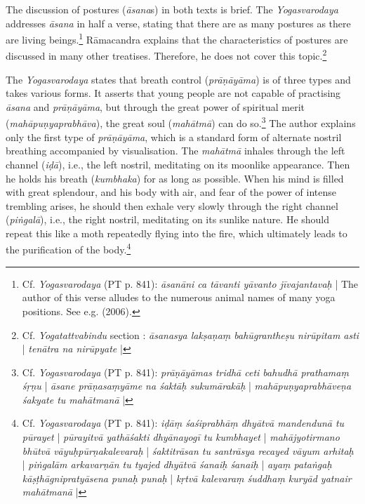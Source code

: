 The discussion of postures (\textit{āsana}s) in both texts is brief. The \emph{Yogasvarodaya} addresses \textit{āsana} in half a verse, stating that there are as many postures as there are living beings.\footnote{Cf. \textit{Yogasvarodaya} (PT p. 841): \textit{āsanāni ca tāvanti yāvanto jīvajantavaḥ} | The author of this verse alludes to the numerous animal names of many yoga positions. See e.g. \citeauthor{encyclopediaasana} (2006).} Rāmacandra explains that the characteristics of postures are discussed in many other treatises. Therefore, he does not cover this topic.\footnote{Cf. \textit{Yogatattvabindu} section : \textit{āsanasya lakṣaṇaṃ bahūgrantheṣu nirūpitam asti} | \textit{tenātra na nirūpyate} |}

The \textit{Yogasvarodaya} states that breath control (\textit{prāṇāyāma}) is of three types and takes various forms. It asserts that young people are not capable of practising \textit{āsana} and \textit{prāṇāyāma}, but through the great power of spiritual merit (\textit{mahāpuṇyaprabhāva}), the great soul (\textit{mahātmā}) can do so.\footnote{Cf. \textit{Yogasvarodaya} (PT p. 841): \textit{prāṇāyāmas tridhā ceti bahudhā prathamaṃ śṛṇu} | \textit{āsane prāṇasaṃyāme na śaktāḥ sukumārakāḥ} | \textit{mahāpuṇyaprabhāveṇa śakyate tu mahātmanā} |} The author explains only the first type of \textit{prāṇāyāma}, which is a standard form of alternate nostril breathing accompanied by visualisation. The \textit{mahātmā} inhales through the left channel (\textit{iḍā}), i.e., the left nostril, meditating on its moonlike appearance. Then he holds his breath (\textit{kumbhaka}) for as long as possible. When his mind is filled with great splendour, and his body with air, and fear of the power of intense trembling arises, he should then exhale very slowly through the right channel (\textit{piṅgalā}), i.e., the right nostril, meditating on its sunlike nature. He should repeat this like a moth repeatedly flying into the fire, which ultimately leads to the purification of the body.\footnote{Cf. \textit{Yogasvarodaya} (PT p. 841): \textit{iḍāṃ śaśiprabhāṃ dhyātvā mandendunā tu pūrayet} | \textit{pūrayitvā yathāśakti dhyānayogī tu kumbhayet} | \textit{mahājyotirmano bhūtvā vāyuḥpūrṇakalevaraḥ} | \textit{śaktitrāsan tu santrāsya recayed vāyum arhitaḥ} | \textit{piṅgalām arkavarṇān tu tyajed dhyātvā śanaiḥ śanaiḥ} | \textit{ayaṃ pataṅgaḥ kāṣṭhāgnipratyāsena punaḥ punaḥ} | \textit{kṛtvā kalevaraṃ śuddhaṃ kuryād yatnair mahātmanā} |}

